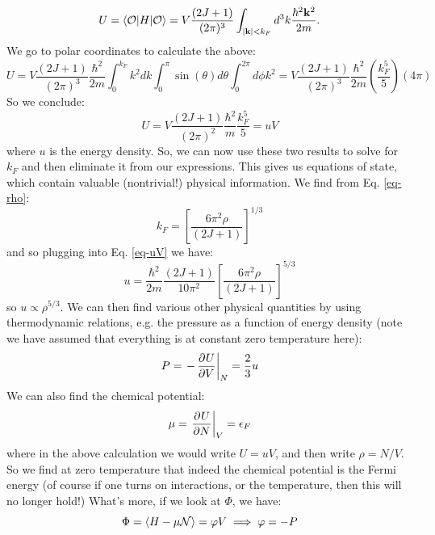 \begin{equation}
    U = \langle \mathcal{O} \rvert H\lvert \mathcal{O} \rangle = V\frac{(2J+1)}{(2\pi)^3}\int_{\lvert \mathbf{k} \rvert < k_F}d^3k \frac{\hbar^2 \mathbf{k}^2}{2m}.
\end{equation}
We go to polar coordinates to calculate the above:
\begin{equation}
    U = V\frac{(2J+1)}{(2\pi)^3} \frac{\hbar^2}{2m}\int_0^{k_F} k^2 dk \int_0^\pi \sin(\theta)d\theta \int_0^{2\pi} d\phi k^2 = V\frac{(2J+1)}{(2\pi)^3} \frac{\hbar^2}{2m}\left(\frac{k_F^5}{5}\right)\left(4\pi\right)
\end{equation}
So we conclude:
\begin{equation}\label{eq-uV}
    U = V\frac{(2J+1)}{(2\pi)^2}\frac{\hbar^2}{m}\frac{k_F^5}{5} = uV
\end{equation}
where $u$ is the energy density. So, we can now use these two results to solve for $k_F$ and then eliminate it from our expressions. This gives us equations of state, which contain valuable (nontrivial!) physical information. We find from Eq. \eqref{eq-rho}:
\begin{equation}\label{eq-kF}
    k_F = \left[\frac{6\pi^2\rho}{(2J+1)}\right]^{1/3}
\end{equation}
and so plugging into Eq. \eqref{eq-uV} we have:
\begin{equation}\label{eq-u}
    u = \frac{\hbar^2}{2m}\frac{(2J+1)}{10\pi^2}\left[\frac{6\pi^2\rho}{(2J+1)}\right]^{5/3}
\end{equation}
so $u \propto \rho^{5/3}$. We can then find various other physical quantities by using thermodynamic relations, e.g. the pressure as a function of energy density (note we have assumed that everything is at constant zero temperature here):
\begin{equation}\label{eq-P}
    P = \left.-\dpd{U}{V}\right|_N = \frac{2}{3}u
\end{equation}
We can also find the chemical potential:
\begin{equation}\label{eq-muef}
    \mu = \left.\dpd{U}{N}\right|_V = \e_F
\end{equation}
where in the above calculation we would write $U = uV$, and then write $\rho = N/V$. So we find at zero temperature that indeed the chemical potential is the Fermi energy (of course if one turns on interactions, or the temperature, then this will no longer hold!) What's more, if we look at $\Phi$, we have:
\begin{equation}\label{eq-phi}
    \Phi = \avg{H - \mu \mathcal{N}} = \varphi V \implies \varphi = -P
\end{equation}


